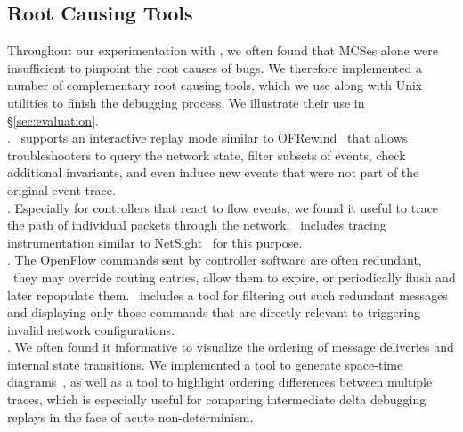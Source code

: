 
\subsection{Root Causing Tools}
\label{subsec:root_causing}

Throughout our experimentation with \projectname, we often found that
MCSes alone were insufficient to
pinpoint the root causes of bugs. We therefore implemented a number of
complementary root
causing tools,
which we use along with Unix utilities to finish the debugging
process. We illustrate their use in \S\ref{sec:evaluation}.\\[0.5ex]
%
. \projectname~supports an interactive replay mode
similar to OFRewind~\cite{ofrewind} that allows troubleshooters to query the
network state, filter subsets of events, check
additional invariants, and
even induce new events that were not part of the original event trace.\\[0.5ex]
%
. Especially for controllers that react to
flow events, we found it useful to trace the path of individual
packets through the network. \projectname~includes tracing instrumentation
similar to NetSight~\cite{ndb14} for this purpose.\\[0.5ex]
%
. The OpenFlow commands sent by controller software
are often redundant, \eg~they may override routing
entries, allow them to expire, or periodically flush
and later repopulate them. \projectname~includes a
tool for filtering out such redundant messages and
displaying only those commands that are directly relevant to triggering invalid network
configurations.\\[0.5ex]
%
. We often found it informative to visualize
the ordering of message deliveries and internal
state transitions. We implemented
a tool to generate space-time diagrams~\cite{Lamport:1978:TCO:359545.359563},
as well as a tool to highlight ordering differences
between multiple traces, which is especially useful for comparing
intermediate delta debugging replays in the face of acute non-determinism.

